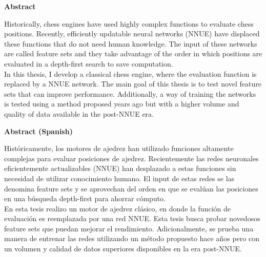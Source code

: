 \thispagestyle{plain}
\begin{center}
\large
\textbf{Abstract}
\end{center}

\begin{center}
\parbox{15cm}{
Historically, chess engines have used highly complex functions to evaluate chess positions. Recently, efficiently updatable neural networks (NNUE) have displaced these functions that do not need human knowledge. The input of these networks are called feature sets and they take advantage of the order in which positions are evaluated in a depth-first search to save computation. \\

In this thesis, I develop a classical chess engine, where the evaluation function is replaced by a NNUE network. The main goal of this thesis is to test novel feature sets that can improve performance. Additionally, a way of training the networks is tested using a method proposed years ago but with a higher volume and quality of data available in the post-NNUE era.
}
\end{center}

\vspace{1cm}

\begin{center}
\large
\textbf{Abstract (Spanish)}
\end{center}

\begin{center}
\parbox{15cm}{
Históricamente, los motores de ajedrez han utilizado funciones altamente complejas para evaluar posiciones de ajedrez. Recientemente las redes neuronales eficientemente actualizables (NNUE) han desplazado a estas funciones sin necesidad de utilizar conocimiento humano. El input de estas redes se las denomina feature sets y se aprovechan del orden en que se evalúan las posiciones en una búsqueda depth-first para ahorrar cómputo. \\

En esta tesis realizo un motor de ajedrez clásico, en donde la función de evaluación es reemplazada por una red NNUE. Esta tesis busca probar novedosos feature sets que puedan mejorar el rendimiento. Adicionalmente, se prueba una manera de entrenar las redes utilizando un método propuesto hace años pero con un volumen y calidad de datos superiores disponibles en la era post-NNUE.
}
\end{center}

\clearpage
